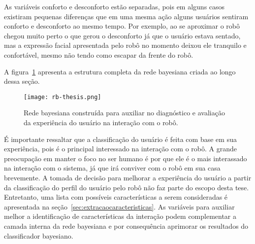 As variáveis conforto e desconforto estão separadas, pois em alguns casos existiram pequenas diferenças que em uma mesma ação alguns usuários sentiram conforto e desconforto ao mesmo tempo. Por exemplo, ao se aproximar o robô chegou muito perto o que gerou o desconforto já que o usuário estava sentado, mas a expressão facial apresentada pelo robô no momento deixou ele tranquilo e confortável, mesmo não tendo como escapar da frente do robô.

A figura~\ref{fig:rb} apresenta a estrutura completa da rede bayesiana criada ao longo dessa seção.

\begin{figure}[ht!]
	\centering
	\begin{minipage}{\textwidth}
		\caption{Rede bayesiana construída para auxiliar no diagnóstico e avaliação da experiência do usuário na interação com o robô.}
		\texttt{[image: rb-thesis.png]}
		\label{fig:rb}
	\end{minipage}
\end{figure}

É importante ressaltar que a classificação do usuário é feita com base em sua experiência, pois é o principal interessado na interação com o robô. A grande preocupação em manter o foco no ser humano é por que ele é o mais interassado na interação com o sistema, já que irá conviver com o robô em sua casa brevemente. A tomada de decisão para melhorar a experiência do usuário a partir da classificação do perfil do usuário pelo robô não faz parte do escopo desta tese. Entretanto, uma lista com possíveis características a serem consideradas é apresentada na seção~\ref{sec:extracaocaracteristicas}. As variáveis para auxiliar melhor a identificação de características da interação podem complementar a camada interna da rede bayesiana e por consequência aprimorar os resultados do classificador bayesiano.
